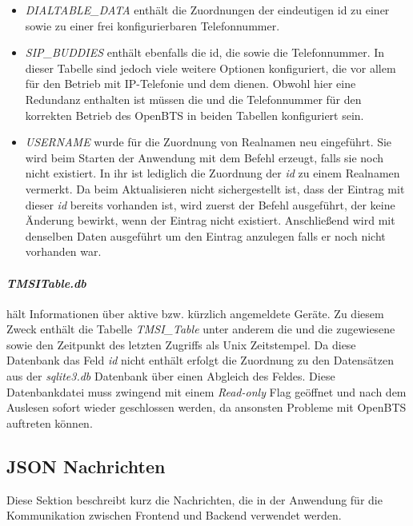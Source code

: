 \begin{itemize}
	\item \textit{DIALTABLE\_DATA} enthält die Zuordnungen der eindeutigen id zu einer \IMSI sowie zu einer frei konfigurierbaren Telefonnummer.
	
	\item \textit{SIP\_BUDDIES} enthält ebenfalls die id, die \IMSI sowie die Telefonnummer. In dieser Tabelle sind jedoch viele weitere Optionen konfiguriert, die vor allem für den Betrieb mit IP-Telefonie und dem \SIP dienen. Obwohl hier eine Redundanz enthalten ist müssen die \IMSI und die Telefonnummer für den korrekten Betrieb des OpenBTS in beiden Tabellen konfiguriert sein.
	
	\item \textit{USERNAME} wurde für die Zuordnung von Realnamen neu eingeführt. Sie wird beim Starten der Anwendung mit dem \SQL Befehl   erzeugt, falls sie noch nicht existiert. In ihr ist lediglich die Zuordnung der \textit{id} zu einem Realnamen vermerkt. Da beim Aktualisieren nicht sichergestellt ist, dass der Eintrag mit dieser \textit{id} bereits vorhanden ist, wird zuerst der Befehl  ausgeführt, der keine Änderung bewirkt, wenn der Eintrag nicht existiert. Anschließend wird  mit denselben Daten ausgeführt um den Eintrag anzulegen falls er noch nicht vorhanden war.
\end{itemize}


\paragraph{\textit{TMSITable.db}} hält Informationen über aktive bzw. kürzlich angemeldete Geräte. Zu diesem Zweck enthält die Tabelle \textit{TMSI\_Table} unter anderem die \IMSI und die zugewiesene \TMSI sowie den Zeitpunkt des letzten Zugriffs als Unix Zeitstempel. Da diese Datenbank das Feld \textit{id} nicht enthält erfolgt die Zuordnung zu den Datensätzen aus der \textit{sqlite3.db} Datenbank über einen Abgleich des \IMSI Feldes. Diese Datenbankdatei muss zwingend mit einem \textit{Read-only} Flag geöffnet und nach dem Auslesen sofort wieder geschlossen werden, da ansonsten Probleme mit OpenBTS auftreten können.

\subsection{JSON Nachrichten}
Diese Sektion beschreibt kurz die \JSON Nachrichten, die in der Anwendung für die Kommunikation zwischen Frontend und Backend verwendet werden.

